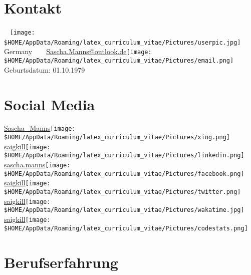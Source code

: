 \documentclass[a4paper]{friggeri-cv} %
\begin{document}


\begin{aside} %
\section{Kontakt}
~
\texttt{[image: \$HOME/AppData/Roaming/latex\_curriculum\_vitae/Pictures/userpic.jpg]}
~
\mystreet
\mycity
Germany
~
\myphone
~
\href{mailto:Sascha.Manns@outlook.de}{Sascha.Manns@outlook.de}\texttt{[image: \$HOME/AppData/Roaming/latex\_curriculum\_vitae/Pictures/email.png]}
Geburtsdatum: 01.10.1979
\section{Social Media}
\href{https://www.xing.com/profile/SaschaZyroslawKyrill_Manns}{Sascha\_Manns}\texttt{[image: \$HOME/AppData/Roaming/latex\_curriculum\_vitae/Pictures/xing.png]}
\href{https://www.linkedin.com/in/saigkill}{saigkill}\texttt{[image: \$HOME/AppData/Roaming/latex\_curriculum\_vitae/Pictures/linkedin.png]}
\href{https://www.facebook.com/sascha.manns}{sascha.manns}\texttt{[image: \$HOME/AppData/Roaming/latex\_curriculum\_vitae/Pictures/facebook.png]}
\href{https://twitter.com/saigkill}{saigkill}\texttt{[image: \$HOME/AppData/Roaming/latex\_curriculum\_vitae/Pictures/twitter.png]}
\href{https://wakatime.com/@saigkill}{saigkill}\texttt{[image: \$HOME/AppData/Roaming/latex\_curriculum\_vitae/Pictures/wakatime.jpg]}
\href{https://codestats.net/users/saigkill}{saigkill}\texttt{[image: \$HOME/AppData/Roaming/latex\_curriculum\_vitae/Pictures/codestats.png]}
\end{aside}


\section{Berufserfahrung}
\end{document}
